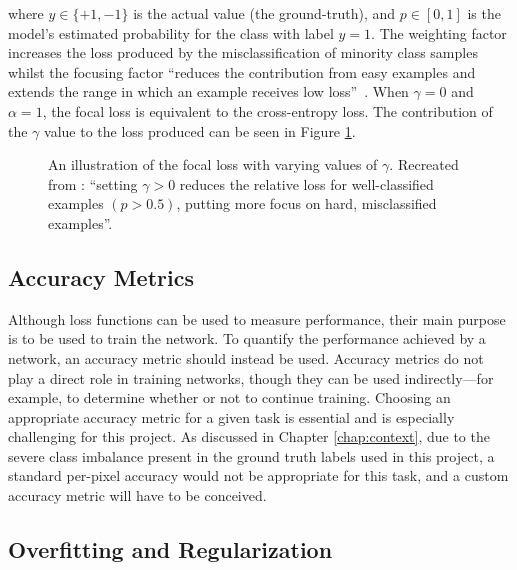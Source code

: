 where $y \in \{+1, -1\}$ is the actual value (the ground-truth), and $p \in [0, 1]$ is the model's estimated probability for the class with label $y = 1$. The weighting factor increases the loss produced by the misclassification of minority class samples whilst the focusing factor ``reduces the contribution from easy examples and extends the range in which an example receives low loss''~\cite{focalloss}. When $\gamma = 0$ and $\alpha = 1$, the focal loss is equivalent to the cross-entropy loss. The contribution of the $\gamma$ value to the loss produced can be seen in Figure \ref{fig:focal}.

\begin{figure}[t]
    \centering
    
    \caption{An illustration of the focal loss with varying values of $\gamma$. Recreated from \cite[Fig. 1]{focalloss}: ``setting $\gamma > 0$ reduces the relative loss for well-classified examples $(p > 0.5)$, putting more focus on hard, misclassified examples''.}
    \label{fig:focal}
\end{figure}

\subsection{Accuracy Metrics}

Although loss functions can be used to measure performance, their main purpose is to be used to train the network. To quantify the performance achieved by a network, an accuracy metric should instead be used. Accuracy metrics do not play a direct role in training networks, though they can be used indirectly---for example, to determine whether or not to continue training. Choosing an appropriate accuracy metric for a given task is essential and is especially challenging for this project. As discussed in Chapter \ref{chap:context}, due to the severe class imbalance present in the ground truth labels used in this project, a standard per-pixel accuracy would not be appropriate for this task, and a custom accuracy metric will have to be conceived.


\subsection{Overfitting and Regularization}
\label{sec:regularization}


